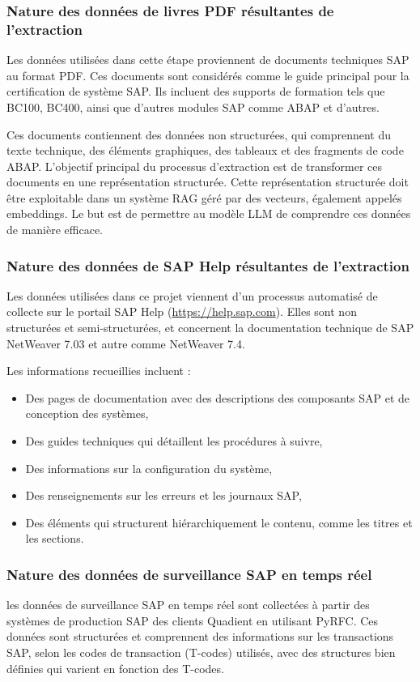 \subsubsection{Nature des données de livres PDF résultantes de l’extraction }
Les données utilisées dans cette étape proviennent de documents techniques SAP au format PDF. Ces documents sont considérés comme le guide principal pour la certification de système SAP. Ils incluent des supports de formation tels que BC100, BC400, ainsi que d'autres modules SAP comme ABAP et d'autres.

Ces documents contiennent des données non structurées, qui comprennent du texte technique, des éléments graphiques, des tableaux et des fragments de code ABAP. L'objectif principal du processus d'extraction est de transformer ces documents en une représentation structurée. Cette représentation structurée doit être exploitable dans un système RAG géré par des vecteurs, également appelés embeddings. Le but est de permettre au modèle LLM de comprendre ces données de manière efficace.
\subsubsection{Nature des données de SAP Help résultantes de l’extraction}
Les données utilisées dans ce projet viennent d’un processus automatisé de collecte sur le portail SAP Help (\url{https://help.sap.com}). Elles sont non structurées et semi-structurées, et concernent la documentation technique de SAP NetWeaver 7.03 et autre comme NetWeaver 7.4.

Les informations recueillies incluent :
\begin{itemize}
    \item Des pages de documentation avec des descriptions des composants SAP et de conception des systèmes,
    \item Des guides techniques qui détaillent les procédures à suivre,
    \item Des informations sur la configuration du système,
    \item Des renseignements sur les erreurs et les journaux SAP,
    \item Des éléments qui structurent hiérarchiquement le contenu, comme les titres et les sections.
\end{itemize}
\subsubsection{Nature des données de surveillance SAP en temps réel}
les données de surveillance SAP en temps réel sont collectées à partir des systèmes de production SAP des clients Quadient en utilisant PyRFC. Ces données sont structurées et comprennent des informations sur les transactions SAP, selon les codes de transaction (T-codes) utilisés, avec des structures bien définies qui varient en fonction des T-codes.

